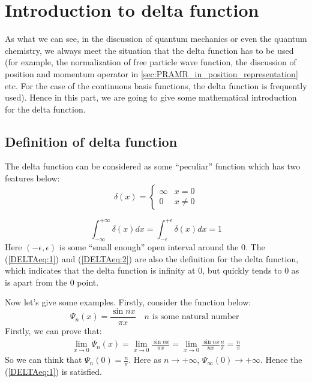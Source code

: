 %
%
%
%
%

\chapter{Introduction to delta function}
\label{sec:delta_function}

As what we can see, in the discussion of quantum mechanics or even the
quantum chemistry, we always meet the situation that the delta
function has to be used (for example, the normalization of free
particle wave function, the discussion of position and momentum
operator in \ref{sec:PRAMR_in_position_representation} etc. For the
case of the continuous basis functions, the delta function is
frequently used). Hence in this part, we are going to give some
mathematical introduction for the delta function.


\section{Definition of delta function}
\label{sec:definition_delta_function}
%
%
%
%
The delta function can be considered as some ``peculiar'' function
which has two features below:
\begin{equation}
\label{DELTAeq:1}
\delta (x) = \begin{cases}
    \infty & x = 0 \\
    0 & x \neq 0
  \end{cases}
\end{equation}

\begin{equation}
\label{DELTAeq:2}
 \int_{-\infty}^{+\infty}\delta (x)dx =
\int_{-\epsilon}^{+\epsilon}\delta (x)dx = 1
\end{equation}
Here $(-\epsilon, \epsilon)$ is some ``small enough'' open interval
around the $0$. The (\ref{DELTAeq:1}) and (\ref{DELTAeq:2}) are also
the definition for the delta function, which indicates that the
delta function is infinity at $0$, but quickly tends to $0$ as is
apart from the $0$ point.

Now let's give some examples. Firstly, consider the function below:
\begin{equation}\label{}
\Psi_{n}(x) = \frac{\sin nx}{\pi x} \quad \text{$n$ is some natural
number }
\end{equation}
Firstly, we can prove that:
\begin{align}\label{}
\lim_{x \rightarrow 0}\Psi_{n}(x) = \lim_{x \rightarrow 0}\frac{\sin
nx}{\pi x} = \lim_{x \rightarrow 0}\frac{\sin nx}{n x}\frac{n}{\pi}
= \frac{n}{\pi}
\end{align}
So we can think that $\Psi_{n}(0) = \frac{n}{\pi}$. Here as $n
\rightarrow +\infty$, $\Psi_{\infty}(0) \rightarrow +\infty$. Hence
the (\ref{DELTAeq:1}) is satisfied.

